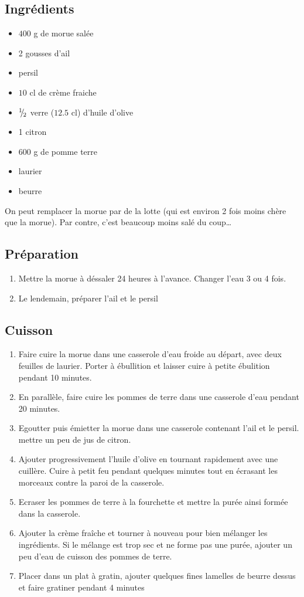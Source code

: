\subsection*{Ingrédients}
\begin{itemize}
\item $400$ g de morue salée
\item 2 gousses d'ail
\item persil
\item $10$ cl de crème fraiche
\item ${{}^{1\!\!}/ _{\!2}}$ verre ($12.5$ cl) d'huile d'olive
\item 1 citron
\item $600$ g de pomme terre
\item laurier
\item beurre
\end{itemize}

\begin{remarque}
On peut remplacer la morue par de la lotte (qui est environ 2 fois moins chère que la morue). Par contre, c'est beaucoup moins salé du coup\dots
\end{remarque}


\subsection*{Préparation}
\begin{enumerate}
\item Mettre la morue à déssaler 24 heures à l'avance. Changer l'eau 3 ou 4 fois.
\item Le lendemain, préparer l'ail et le persil
\end{enumerate}

\subsection*{Cuisson}
\begin{enumerate}
\item Faire cuire la morue dans une casserole d'eau froide au départ, avec deux feuilles de laurier. Porter à ébullition et laisser cuire à petite ébulition pendant 10 minutes.
\item En parallèle, faire cuire les pommes de terre dans une casserole d'eau pendant 20 minutes.
\item Egoutter puis émietter la morue dans une casserole contenant l'ail et le persil. mettre un peu de jus de citron.
\item Ajouter progressivement l'huile d'olive en tournant rapidement avec une cuillère. Cuire à petit feu pendant quelques minutes tout en écrasant les morceaux contre la paroi de la casserole.
\item Ecraser les pommes de terre à la fourchette et mettre la purée ainsi formée dans la casserole.
\item Ajouter la crème fraîche et tourner à nouveau pour bien mélanger les ingrédients. Si le mélange est trop sec et ne forme pas une purée, ajouter un peu d'eau de cuisson des pommes de terre.
\item Placer dans un plat à gratin, ajouter quelques fines lamelles de beurre dessus et faire gratiner pendant 4 minutes
\end{enumerate}


